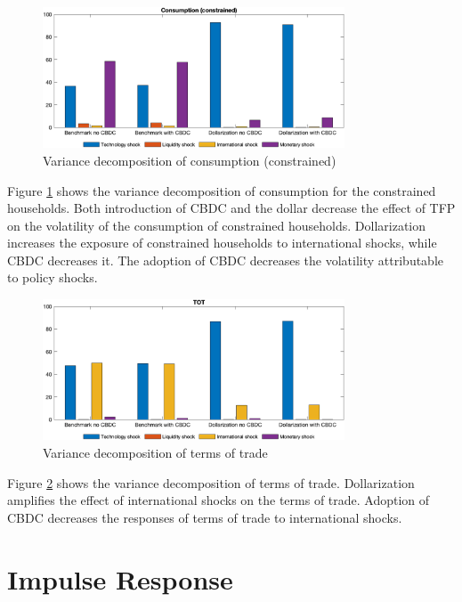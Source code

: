 \documentclass[12pt]{article}
\begin{document}
\begin{figure}[h!]
\centering
\includegraphics[width=0.8\textwidth]{log_c2}
\caption{Variance decomposition of consumption (constrained)}
\label{log_c2}
\end{figure}

Figure \ref{log_c2} shows the variance decomposition of consumption for the constrained households. Both introduction of CBDC and the dollar decrease the effect of TFP on the volatility of the consumption of constrained households. Dollarization increases the exposure of constrained households to international shocks, while CBDC decreases it. The adoption of CBDC decreases the volatility attributable to policy shocks. 

\begin{figure}[h!]
\centering
\includegraphics[width=0.8\textwidth]{log_tot}
\caption{Variance decomposition of terms of trade}
\label{log_tot}
\end{figure}

Figure \ref{log_tot} shows the variance decomposition of terms of trade. Dollarization amplifies the effect of international shocks on the terms of trade. Adoption of CBDC decreases the responses of terms of trade to international shocks. 

\section{Impulse Response}
\end{document}
